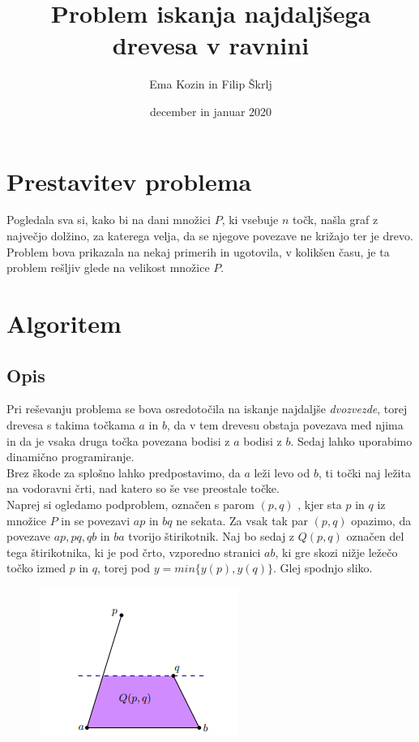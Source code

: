 \documentclass[a4paper,12pt]{article}
\title{Problem iskanja najdaljšega drevesa v ravnini}
\author{Ema Kozin in Filip Škrlj}
\date{december in januar 2020}
\begin{document}
	
\maketitle
	
\newpage

\tableofcontents
	
\newpage
\section{Prestavitev problema}

Pogledala sva si, kako bi na dani množici $P$, ki vsebuje $n$ točk, našla graf z največjo dolžino, za katerega velja, da se njegove povezave ne križajo ter je drevo.
 Problem bova prikazala na nekaj primerih in ugotovila, v kolikšen času, je ta problem rešljiv glede na velikost množice $P$. 


\section{Algoritem}

\subsection{Opis}
Pri reševanju problema se bova osredotočila na iskanje najdaljše \emph{dvozvezde}, torej drevesa s takima točkama $a$ in $b$,
 da v tem drevesu obstaja povezava med njima
in da je vsaka druga točka povezana bodisi z $a$ bodisi z $b$. Sedaj lahko uporabimo dinamično programiranje. \\
Brez škode za splošno lahko predpostavimo, da $a$ leži levo od $b$, ti točki naj ležita na vodoravni črti, nad katero so še vse preostale točke. \\
Naprej si ogledamo podproblem, označen s parom $(p, q)$ , kjer sta $p$ in $q$ iz množice $P$ in se povezavi $ap$ in $bq$ ne sekata.
 Za vsak tak par $(p, q)$ opazimo, da povezave $ap, pq, qb$ in $ba$ tvorijo štirikotnik. Naj bo sedaj z $Q(p,q)$ označen del tega štirikotnika, ki je pod črto,
  vzporedno stranici $ab$, ki gre skozi nižje ležečo točko izmed $p$ in $q$, torej pod $y = min\{y(p),y(q)\}$. Glej spodnjo sliko.\\
  
\begin{figure}[h]
	\centering
	\includegraphics{primer_Q(p,q).png}
\end{figure}
\end{document}
